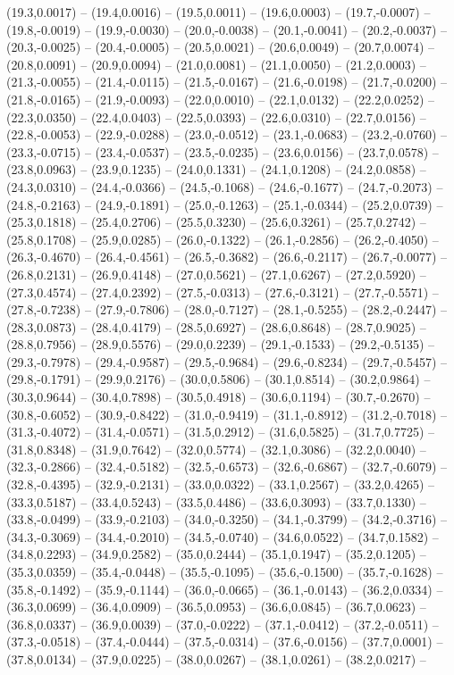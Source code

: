 \documentclass{SVnote}
\begin{document}
(19.3,0.0017) -- (19.4,0.0016) -- (19.5,0.0011) -- (19.6,0.0003) -- (19.7,-0.0007) -- (19.8,-0.0019) -- (19.9,-0.0030) -- (20.0,-0.0038) -- (20.1,-0.0041) -- (20.2,-0.0037) -- (20.3,-0.0025) -- (20.4,-0.0005) -- (20.5,0.0021) -- (20.6,0.0049) -- (20.7,0.0074) -- (20.8,0.0091) -- (20.9,0.0094) -- (21.0,0.0081) -- (21.1,0.0050) -- (21.2,0.0003) -- (21.3,-0.0055) -- (21.4,-0.0115) -- (21.5,-0.0167) -- (21.6,-0.0198) -- (21.7,-0.0200) -- (21.8,-0.0165) -- (21.9,-0.0093) -- (22.0,0.0010) -- (22.1,0.0132) -- (22.2,0.0252) -- (22.3,0.0350) -- (22.4,0.0403) -- (22.5,0.0393) -- (22.6,0.0310) -- (22.7,0.0156) -- (22.8,-0.0053) -- (22.9,-0.0288) -- (23.0,-0.0512) -- (23.1,-0.0683) -- (23.2,-0.0760) -- (23.3,-0.0715) -- (23.4,-0.0537) -- (23.5,-0.0235) -- (23.6,0.0156) -- (23.7,0.0578) -- (23.8,0.0963) -- (23.9,0.1235) -- (24.0,0.1331) -- (24.1,0.1208) -- (24.2,0.0858) -- (24.3,0.0310) -- (24.4,-0.0366) -- (24.5,-0.1068) -- (24.6,-0.1677) -- (24.7,-0.2073) -- (24.8,-0.2163) -- (24.9,-0.1891) -- (25.0,-0.1263) -- (25.1,-0.0344) -- (25.2,0.0739) -- (25.3,0.1818) -- (25.4,0.2706) -- (25.5,0.3230) -- (25.6,0.3261) -- (25.7,0.2742) -- (25.8,0.1708) -- (25.9,0.0285) -- (26.0,-0.1322) -- (26.1,-0.2856) -- (26.2,-0.4050) -- (26.3,-0.4670) -- (26.4,-0.4561) -- (26.5,-0.3682) -- (26.6,-0.2117) -- (26.7,-0.0077) -- (26.8,0.2131) -- (26.9,0.4148) -- (27.0,0.5621) -- (27.1,0.6267) -- (27.2,0.5920) -- (27.3,0.4574) -- (27.4,0.2392) -- (27.5,-0.0313) -- (27.6,-0.3121) -- (27.7,-0.5571) -- (27.8,-0.7238) -- (27.9,-0.7806) -- (28.0,-0.7127) -- (28.1,-0.5255) -- (28.2,-0.2447) -- (28.3,0.0873) -- (28.4,0.4179) -- (28.5,0.6927) -- (28.6,0.8648) -- (28.7,0.9025) -- (28.8,0.7956) -- (28.9,0.5576) -- (29.0,0.2239) -- (29.1,-0.1533) -- (29.2,-0.5135) -- (29.3,-0.7978) -- (29.4,-0.9587) -- (29.5,-0.9684) -- (29.6,-0.8234) -- (29.7,-0.5457) -- (29.8,-0.1791) -- (29.9,0.2176) -- (30.0,0.5806) -- (30.1,0.8514) -- (30.2,0.9864) -- (30.3,0.9644) -- (30.4,0.7898) -- (30.5,0.4918) -- (30.6,0.1194) -- (30.7,-0.2670) -- (30.8,-0.6052) -- (30.9,-0.8422) -- (31.0,-0.9419) -- (31.1,-0.8912) -- (31.2,-0.7018) -- (31.3,-0.4072) -- (31.4,-0.0571) -- (31.5,0.2912) -- (31.6,0.5825) -- (31.7,0.7725) -- (31.8,0.8348) -- (31.9,0.7642) -- (32.0,0.5774) -- (32.1,0.3086) -- (32.2,0.0040) -- (32.3,-0.2866) -- (32.4,-0.5182) -- (32.5,-0.6573) -- (32.6,-0.6867) -- (32.7,-0.6079) -- (32.8,-0.4395) -- (32.9,-0.2131) -- (33.0,0.0322) -- (33.1,0.2567) -- (33.2,0.4265) -- (33.3,0.5187) -- (33.4,0.5243) -- (33.5,0.4486) -- (33.6,0.3093) -- (33.7,0.1330) -- (33.8,-0.0499) -- (33.9,-0.2103) -- (34.0,-0.3250) -- (34.1,-0.3799) -- (34.2,-0.3716) -- (34.3,-0.3069) -- (34.4,-0.2010) -- (34.5,-0.0740) -- (34.6,0.0522) -- (34.7,0.1582) -- (34.8,0.2293) -- (34.9,0.2582) -- (35.0,0.2444) -- (35.1,0.1947) -- (35.2,0.1205) -- (35.3,0.0359) -- (35.4,-0.0448) -- (35.5,-0.1095) -- (35.6,-0.1500) -- (35.7,-0.1628) -- (35.8,-0.1492) -- (35.9,-0.1144) -- (36.0,-0.0665) -- (36.1,-0.0143) -- (36.2,0.0334) -- (36.3,0.0699) -- (36.4,0.0909) -- (36.5,0.0953) -- (36.6,0.0845) -- (36.7,0.0623) -- (36.8,0.0337) -- (36.9,0.0039) -- (37.0,-0.0222) -- (37.1,-0.0412) -- (37.2,-0.0511) -- (37.3,-0.0518) -- (37.4,-0.0444) -- (37.5,-0.0314) -- (37.6,-0.0156) -- (37.7,0.0001) -- (37.8,0.0134) -- (37.9,0.0225) -- (38.0,0.0267) -- (38.1,0.0261) -- (38.2,0.0217) -- 
\end{document}

